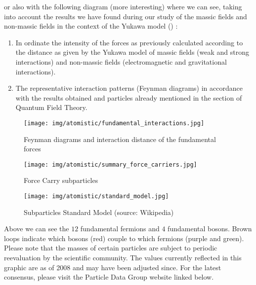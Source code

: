 	 or also with the following diagram (more interesting) where we can see, taking into account the results we have found during our study of the massic fields and non-massic fields in the context of the Yukawa model () : 
	\begin{enumerate}
		\item In ordinate the intensity of the forces as previously calculated according to the distance as given by the Yukawa model of massic fields (weak and strong interactions) and non-massic fields (electromagnetic and gravitational interactions).

		\item The representative interaction patterns (Feynman diagrams) in accordance with the results obtained and particles already mentioned in the section of Quantum Field Theory.
	\end{enumerate}
	\begin{figure}[H]
		\begin{center}
		\texttt{[image: img/atomistic/fundamental\_interactions.jpg]}
		\end{center}	
		\caption{Feynman diagrams and interaction distance of the fundamental forces}
	\end{figure}
	 
	 \begin{figure}[H]
		\begin{center}
		\texttt{[image: img/atomistic/summary\_force\_carriers.jpg]}
		\end{center}	
		\caption{Force Carry subparticles}
	\end{figure}
	
	\begin{figure}[H]
		\begin{center}
		\texttt{[image: img/atomistic/standard\_model.jpg]}
		\end{center}	
		\caption{Subparticles Standard Model (source: Wikipedia)}
	\end{figure}
	Above we can see the $12$ fundamental fermions and $4$ fundamental bosons. Brown loops indicate which bosons (red) couple to which fermions (purple and green). Please note that the masses of certain particles are subject to periodic reevaluation by the scientific community. The values currently reflected in this graphic are as of 2008 and may have been adjusted since. For the latest consensus, please visit the Particle Data Group website linked below.
	
